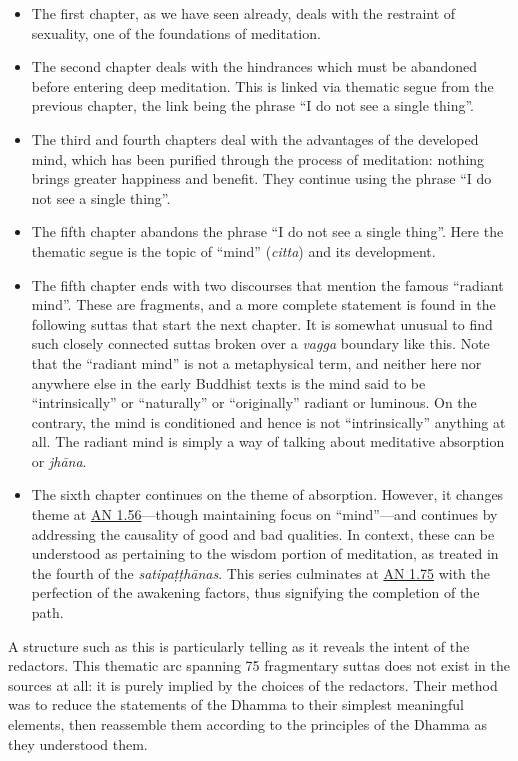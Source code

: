 \documentclass[12pt,openany]{book}%
\begin{document}
\begin{itemize}%
\item The first chapter, as we have seen already, deals with the restraint of sexuality, one of the foundations of meditation.%
\item The second chapter deals with the hindrances which must be abandoned before entering deep meditation. This is linked via thematic segue from the previous chapter, the link being the phrase “I do not see a single thing”.%
\item The third and fourth chapters deal with the advantages of the developed mind, which has been purified through the process of meditation: nothing brings greater happiness and benefit. They continue using the phrase “I do not see a single thing”.%
\item The fifth chapter abandons the phrase “I do not see a single thing”. Here the thematic segue is the topic of “mind” (\textit{citta}) and its development.%
\item The fifth chapter ends with two discourses that mention the famous “radiant mind”. These are fragments, and a more complete statement is found in the following suttas that start the next chapter. It is somewhat unusual to find such closely connected suttas broken over a \textit{vagga} boundary like this. Note that the “radiant mind” is not a metaphysical term, and neither here nor anywhere else in the early Buddhist texts is the mind said to be “intrinsically” or “naturally” or “originally” radiant or luminous. On the contrary, the mind is conditioned and hence is not “intrinsically” anything at all. The radiant mind is simply a way of talking about meditative absorption or \textit{\textsanskrit{jhāna}}.%
\item The sixth chapter continues on the theme of absorption. However, it changes theme at \href{https://suttacentral.net/an1.56}{AN 1.56}—though maintaining focus on “mind”—and continues by addressing the causality of good and bad qualities. In context, these can be understood as pertaining to the wisdom portion of meditation, as treated in the fourth of the \textit{\textsanskrit{satipaṭṭhānas}}. This series culminates at \href{https://suttacentral.net/an1.75}{AN 1.75} with the perfection of the awakening factors, thus signifying the completion of the path.%
\end{itemize}

A structure such as this is particularly telling as it reveals the intent of the redactors. This thematic arc spanning 75 fragmentary suttas does not exist in the sources at all: it is purely implied by the choices of the redactors. Their method was to reduce the statements of the Dhamma to their simplest meaningful elements, then reassemble them according to the principles of the Dhamma as they understood them.
\end{document}
